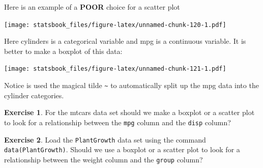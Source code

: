 \documentclass[
]{book}
\newenvironment{Shaded}{\begin{snugshade}}{\end{snugshade}}
\newcommand{\AttributeTok}[1]{\textcolor[rgb]{0.77,0.63,0.00}{#1}}
\newcommand{\FunctionTok}[1]{\textcolor[rgb]{0.00,0.00,0.00}{#1}}
\newcommand{\NormalTok}[1]{#1}
\newcommand{\SpecialCharTok}[1]{\textcolor[rgb]{0.00,0.00,0.00}{#1}}
\newcommand{\StringTok}[1]{\textcolor[rgb]{0.31,0.60,0.02}{#1}}
\theoremstyle{definition}
\theoremstyle{definition}
\theoremstyle{definition}
\newtheorem{exercise}{Exercise}[chapter]
\theoremstyle{definition}
\theoremstyle{remark}
\begin{document}
Here is an example of a \textbf{POOR} choice for a scatter plot

\begin{Shaded}
\end{Shaded}

\texttt{[image: statsbook\_files/figure-latex/unnamed-chunk-120-1.pdf]}

Here cylinders is a categorical variable and mpg is a continuous variable. It is better to make a boxplot of this data:

\begin{Shaded}
\end{Shaded}

\texttt{[image: statsbook\_files/figure-latex/unnamed-chunk-121-1.pdf]}

Notice is used the magical tilde \texttt{\textasciitilde{}} to automatically split up the mpg data into the cylinder categories.

\begin{exercise}
\protect\hypertarget{exr:unnamed-chunk-122}{}\label{exr:unnamed-chunk-122}For the mtcars data set should we make a boxplot or a scatter plot to look for a relationship between the \texttt{mpg} column and the \texttt{disp} column?
\end{exercise}

\begin{exercise}
\protect\hypertarget{exr:unnamed-chunk-123}{}\label{exr:unnamed-chunk-123}Load the \texttt{PlantGrowth} data set using the command \texttt{data(PlantGrowth)}. Should we use a boxplot or a scatter plot to look for a relationship between the weight column and the \texttt{group} column?
\end{exercise}
\end{document}
